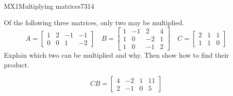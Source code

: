 \begin{exercise}{MX1}{Multiplying matrices}{7314} 
\begin{exerciseStatement} 

Of the following three matrices, only two may be multiplied. \[
          A=\left[\begin{array}{cccc}
1 & 2 & -1 & -1 \\
0 & 0 & 1 & -2
\end{array}\right] \hspace{1em} B=\left[\begin{array}{cccc}
1 & -1 & 2 & 4 \\
1 & 0 & -2 & 1 \\
1 & 0 & -1 & 2
\end{array}\right] \hspace{1em} C=\left[\begin{array}{ccc}
2 & 1 & 1 \\
1 & 1 & 0
\end{array}\right]
      \] Explain which two can be multiplied and why. Then show how to find their product.

 \end{exerciseStatement}
 \begin{exerciseAnswer} \[CB=\left[\begin{array}{cccc}
4 & -2 & 1 & 11 \\
2 & -1 & 0 & 5
\end{array}\right]\] \end{exerciseAnswer}
 \end{exercise}


